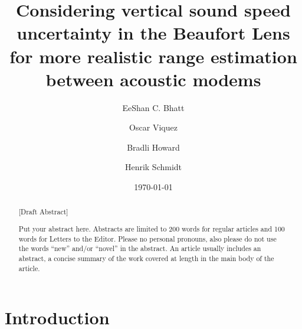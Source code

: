 \title[JASA/Sample JASA Article]{Considering vertical sound speed uncertainty in the Beaufort Lens for more realistic range estimation between acoustic modems}
\author{EeShan C. Bhatt}
\author{Oscar Viquez}
\author{Bradli Howard}
\author{Henrik Schmidt}




\date{\today}

\begin{abstract}

{\color{red}[Draft Abstract]}

Put your abstract here. Abstracts are limited to 200 words for
regular articles and 100 words for Letters to the Editor. Please no
personal pronouns, also please do not use the words ``new'' and/or
``novel'' in the abstract. An article usually includes an abstract, a
concise summary of the work covered at length in the main body of the
article.
\end{abstract}


\maketitle



\section{\label{sec:1} Introduction}

